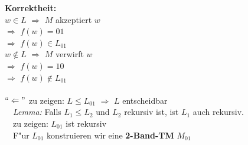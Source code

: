 \documentclass[a4paper,11pt]{scrartcl}
\begin{document}
	  \noindent  \textbf{Korrektheit:}\\
	   $w\in L$ $\Rightarrow$ $M$ akzeptiert $w$\\
	   \indent \indent  \indent $\Rightarrow$ $f(w)=01$\\
	     \indent \indent \indent $\Rightarrow$ $f(w)\in L_{01}$\\
	     
	\noindent      $w\notin L$ $\Rightarrow$ $M$ verwirft $w$\\
	   \indent \indent  \indent $\Rightarrow$ $f(w)=10$\\
	     \indent \indent \indent $\Rightarrow$ $f(w)\notin L_{01}$\\ \\
	     
	\noindent \textbf{ $``\Leftarrow"$} zu zeigen:  $L \le L_{01}$ $\Rightarrow$ $L$ entscheidbar  \\
	    \indent \indent \ \  \textit{Lemma:} Falls $L_1 \le L_2$ und $L_2$ rekursiv ist, ist $L_1$ auch rekursiv.\\
             \indent \indent \ \   zu zeigen: $L_{01}$ ist rekursiv\\
            \indent \indent \ \    F"ur $L_{01}$ konstruieren wir eine \textbf{2-Band-TM} $M_{01}$\\ \\
\end{document}
